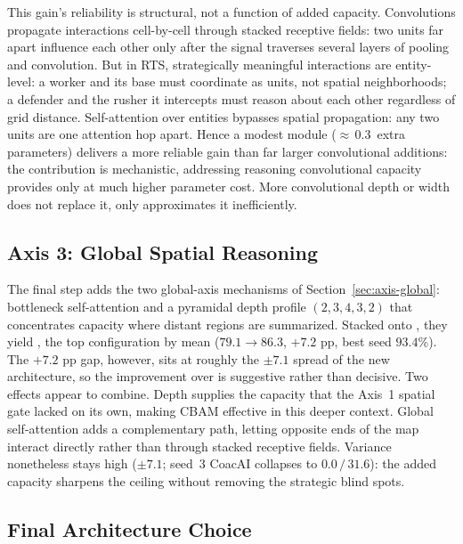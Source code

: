 \vspace*{0.25cm}

This gain's reliability is structural, not a function of added capacity. Convolutions propagate interactions cell-by-cell through stacked receptive fields: two units far apart influence each other only after the signal traverses several layers of pooling and convolution. But in RTS, strategically meaningful interactions are entity-level: a worker and its base must coordinate as units, not spatial neighborhoods; a defender and the rusher it intercepts must reason about each other regardless of grid distance. Self-attention over entities bypasses spatial propagation: any two units are one attention hop apart. Hence a modest module (${\approx}\,$0.3\, extra parameters) delivers a more reliable gain than far larger convolutional additions: the contribution is mechanistic, addressing reasoning convolutional capacity provides only at much higher parameter cost. More convolutional depth or width does not replace it, only approximates it inefficiently.

\subsection{Axis 3: Global Spatial Reasoning}

The final step adds the two global-axis mechanisms of Section~\ref{sec:axis-global}: bottleneck self-attention and a pyramidal depth profile $(2,3,4,3,2)$ that concentrates capacity where distant regions are summarized. Stacked onto , they yield , the top configuration by mean ($79.1 \to 86.3$, $+7.2$ pp, best seed $93.4$\%). The $+7.2$ pp gap, however, sits at roughly the $\pm7.1$ spread of the new architecture, so the improvement over  is suggestive rather than decisive. Two effects appear to combine. Depth supplies the capacity that the Axis~1 spatial gate lacked on its own, making CBAM effective in this deeper context. Global self-attention adds a complementary path, letting opposite ends of the map interact directly rather than through stacked receptive fields. Variance nonetheless stays high ($\pm7.1$; seed~$3$ CoacAI collapses to $0.0\,/\,31.6$): the added capacity sharpens the ceiling without removing the strategic blind spots.

\subsection{Final Architecture Choice}

